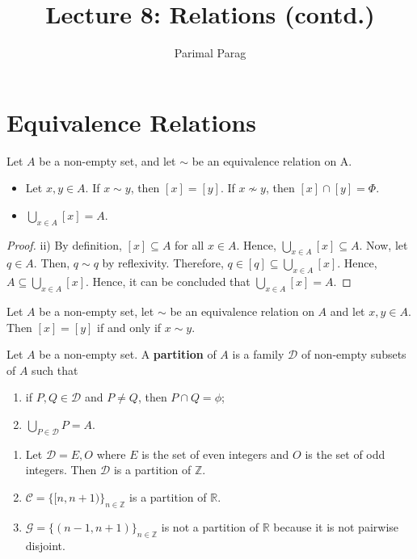 \documentclass[a4paper,english,12pt]{article}
\title{Lecture 8: Relations (contd.)}
\author{Parimal Parag}
\begin{document}
\maketitle

\section{Equivalence Relations}
\begin{thm} Let $A$ be a non-empty set, and let $\sim$ be an equivalence relation on A.
	\begin{itemize}
		\item Let $x,y \in A$. If $x \sim y$, then $[x] = [y]$. If $x \nsim y$, then $[x] \cap [y] = \Phi$.
		\item $\bigcup\limits_{{x\in A}} [x] = A$.
	\end{itemize}
\end{thm}

\begin{proof} ii) By definition, $[x] \subseteq A$ for all $x \in A$. Hence, $\bigcup\limits_{{x \in A}} [x] \subseteq A$. Now, let $q \in A$. Then, $q \sim q$ by reflexivity. Therefore, $q \in [q] \subseteq \bigcup\limits_{{x \in A}} [x]$. Hence, $A \subseteq \bigcup\limits_{{x \in A}} [x]$. Hence, it can be concluded that $\bigcup\limits_{{x \in A}} [x] = A$.
\end{proof}

\begin{cor} Let $A$ be a non-empty set, let $\sim$ be an equivalence relation on $A$ and let $x, y \in A$. Then $[x] = [y]$ if and only if $x \sim y$.
\end{cor}

\begin{defn} Let $A$ be a non-empty set. A \textbf{partition} of $A$ is a family $\mathcal{D}$ of non-empty subsets of $A$ such that
	\begin{enumerate}
		\item if $P,Q \in \mathcal{D}$ and $P \neq Q$, then $P \cap Q = \phi$;
		\item $\bigcup \limits_{{P \in \mathcal{D}}} P = A$.
	\end{enumerate}
	
\end{defn}

\begin{exmp}
	\begin{enumerate}
		\item Let $\mathcal{D} = {E,O}$ where $E$ is the set of even integers and $O$ is the set of odd integers. Then $\mathcal{D}$ is a partition of $\mathbb{Z}$.
		\item $\mathcal{C} = \{[n,n+1)\}_{n \in \mathbb{Z}}$ is a partition of $\mathbb{R}$.
		\item $\mathcal{G} =\{(n-1,n+1)\}_{n \in \mathbb{Z}}$ is not a partition of $\mathbb{R}$ because it is not pairwise disjoint.
	\end{enumerate}
\end{exmp}
\end{document}
